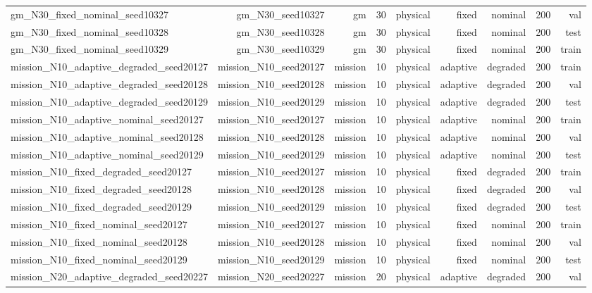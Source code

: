 \begin{tabular}{lrrrrrrrr}
gm\_N30\_fixed\_nominal\_seed10327 & gm\_N30\_seed10327 & gm & 30 & physical & fixed & nominal & 200 & val \\
gm\_N30\_fixed\_nominal\_seed10328 & gm\_N30\_seed10328 & gm & 30 & physical & fixed & nominal & 200 & test \\
gm\_N30\_fixed\_nominal\_seed10329 & gm\_N30\_seed10329 & gm & 30 & physical & fixed & nominal & 200 & train \\
mission\_N10\_adaptive\_degraded\_seed20127 & mission\_N10\_seed20127 & mission & 10 & physical & adaptive & degraded & 200 & train \\
mission\_N10\_adaptive\_degraded\_seed20128 & mission\_N10\_seed20128 & mission & 10 & physical & adaptive & degraded & 200 & val \\
mission\_N10\_adaptive\_degraded\_seed20129 & mission\_N10\_seed20129 & mission & 10 & physical & adaptive & degraded & 200 & test \\
mission\_N10\_adaptive\_nominal\_seed20127 & mission\_N10\_seed20127 & mission & 10 & physical & adaptive & nominal & 200 & train \\
mission\_N10\_adaptive\_nominal\_seed20128 & mission\_N10\_seed20128 & mission & 10 & physical & adaptive & nominal & 200 & val \\
mission\_N10\_adaptive\_nominal\_seed20129 & mission\_N10\_seed20129 & mission & 10 & physical & adaptive & nominal & 200 & test \\
mission\_N10\_fixed\_degraded\_seed20127 & mission\_N10\_seed20127 & mission & 10 & physical & fixed & degraded & 200 & train \\
mission\_N10\_fixed\_degraded\_seed20128 & mission\_N10\_seed20128 & mission & 10 & physical & fixed & degraded & 200 & val \\
mission\_N10\_fixed\_degraded\_seed20129 & mission\_N10\_seed20129 & mission & 10 & physical & fixed & degraded & 200 & test \\
mission\_N10\_fixed\_nominal\_seed20127 & mission\_N10\_seed20127 & mission & 10 & physical & fixed & nominal & 200 & train \\
mission\_N10\_fixed\_nominal\_seed20128 & mission\_N10\_seed20128 & mission & 10 & physical & fixed & nominal & 200 & val \\
mission\_N10\_fixed\_nominal\_seed20129 & mission\_N10\_seed20129 & mission & 10 & physical & fixed & nominal & 200 & test \\
mission\_N20\_adaptive\_degraded\_seed20227 & mission\_N20\_seed20227 & mission & 20 & physical & adaptive & degraded & 200 & val \\

\end{tabular}
